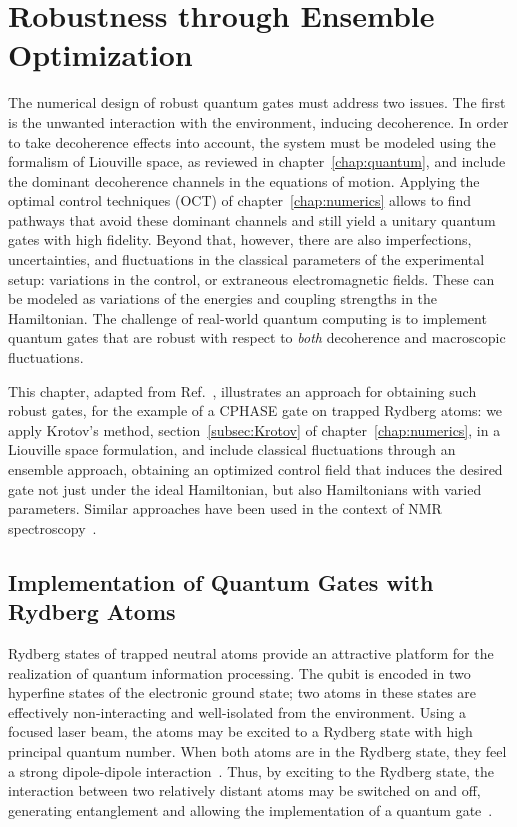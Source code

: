 \chapter{Robustness through Ensemble Optimization}
\label{chap:robust}

The numerical design of robust quantum gates must address two issues. The first
is the unwanted interaction with the environment, inducing decoherence.
In order to take decoherence effects into account, the
system must be modeled using the formalism of Liouville space, as
reviewed in chapter~\ref{chap:quantum}, and include the dominant decoherence
channels in the equations of motion.
Applying the optimal control techniques (OCT) of chapter~\ref{chap:numerics}
allows to find pathways that avoid these dominant channels and still yield
a unitary quantum gates with high fidelity.
Beyond that, however, there are also imperfections, uncertainties, and
fluctuations in the classical parameters of the experimental setup: variations
in the control, or extraneous electromagnetic fields. These can be modeled
as variations of the energies and coupling strengths in the Hamiltonian. The
challenge of real-world quantum computing is to implement quantum gates that are
robust with respect to \emph{both} decoherence and macroscopic fluctuations.

This chapter, adapted from Ref.~\cite{GoerzPRA2014}, illustrates an approach for
obtaining such robust gates, for the example of a CPHASE gate on trapped Rydberg
atoms: we apply Krotov's method, section~\ref{subsec:Krotov} of
chapter~\ref{chap:numerics}, in a Liouville space formulation, and include
classical fluctuations through an ensemble approach, obtaining an optimized control
field that induces the desired gate not just under the ideal Hamiltonian, but
also Hamiltonians with varied parameters. Similar approaches have been used  in
the context of NMR spectroscopy~\cite{kobzar2004nmr,kobzar2008nmr}.


\section{Implementation of Quantum Gates with Rydberg Atoms}
\label{sec:RydbergImplemenation}

Rydberg states of trapped neutral atoms provide an attractive platform for
the realization of quantum information processing. The qubit is encoded in two
hyperfine states of the electronic ground state; two atoms in these states are
effectively non-interacting and well-isolated from the environment.
Using a focused laser beam, the atoms may be excited to a Rydberg
state with high principal quantum number. When both atoms are in the Rydberg
state, they feel a strong dipole-dipole interaction~\cite{SaffmanRMP2010}.
Thus, by exciting to the Rydberg state, the interaction between two relatively
distant atoms may be switched on and off, generating entanglement and allowing
the implementation of a quantum gate~\cite{WilkPRL10,IsenhowerPRL10}.

